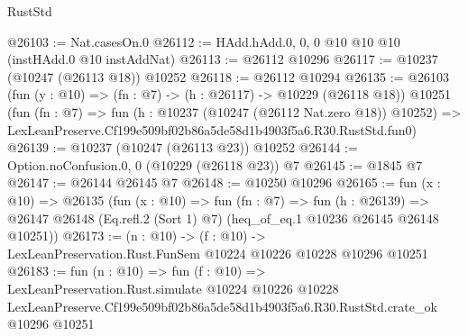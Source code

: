 \begin{lexlean}{RustStd}
\begin{coremodule}
@26103 := Nat.casesOn.{0}
@26112 := HAdd.hAdd.{0, 0, 0} @10 @10 @10 (instHAdd.{0} @10 instAddNat)
@26113 := @26112 @10296
@26117 := @10237 (@10247 (@26113 @18)) @10252
@26118 := @26112 @10294
@26135 := @26103
    (fun (y : @10) => (fn : @7) -> (h : @26117) -> @10229 (@26118 @18))
    @10251
    (fun (fn : @7) =>
    fun (h : @10237 (@10247 (@26112 Nat.zero @18)) @10252) =>
    LexLeanPreserve.Cf199e509bf02b86a5de58d1b4903f5a6.R30.RustStd.fun0)
@26139 := @10237 (@10247 (@26113 @23)) @10252
@26144 := Option.noConfusion.{0, 0} (@10229 (@26118 @23)) @7
@26145 := @1845 @7
@26147 := @26144 @26145 @7
@26148 := @10250 @10296
@26165 := fun (x : @10) =>
  @26135
    (fun (x : @10) =>
    fun (fn : @7) =>
    fun (h : @26139) =>
    @26147 @26148 (Eq.refl.{2} (Sort 1) @7) (heq_of_eq.{1} @10236 @26145 @26148 @10251))
@26173 := (n : @10) ->
  (f : @10) -> LexLeanPreservation.Rust.FunSem @10224 @10226 @10228 @10296 @10251
@26183 := fun (n : @10) =>
  fun (f : @10) =>
  LexLeanPreservation.Rust.simulate
    @10224
    @10226
    @10228
    LexLeanPreserve.Cf199e509bf02b86a5de58d1b4903f5a6.R30.RustStd.crate_ok
    @10296
    @10251
\end{coremodule}
\end{lexlean}
